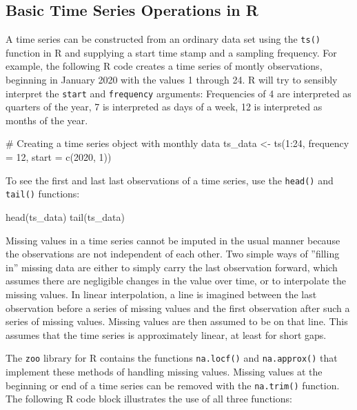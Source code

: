 \begin{withcode}
\section{Basic Time Series Operations in R}

A time series can be constructed from an ordinary data set using the \texttt{ts()} function in R and supplying a start time stamp and a sampling frequency. For example, the following R code creates a time series of montly observations, beginning in January 2020 with the values 1 through 24. R will try to sensibly interpret the \texttt{start} and \texttt{frequency} arguments: Frequencies of 4 are interpreted as quarters of the year, 7 is interpreted as days of a week, 12 is interpreted as months of the year.

\begin{Rcode}
# Creating a time series object with monthly data
ts_data <- ts(1:24, frequency = 12, start = c(2020, 1))
\end{Rcode}

\noindent To see the first and last last observations of a time series, use the \texttt{head()} and \texttt{tail()} functions:

\begin{Rcode}
head(ts_data)
tail(ts_data)
\end{Rcode}

Missing values in a time series cannot be imputed in the usual manner because the observations are not independent of each other. Two simple ways of ''filling in'' missing data are either to simply carry the last observation forward, which assumes there are negligible changes in the value over time, or to interpolate the missing values. In linear interpolation, a line is imagined between the last observation before a series of missing values and the first observation after such a series of missing values. Missing values are then assumed to be on that line. This assumes that the time series is approximately linear, at least for short gaps. 

The \texttt{zoo} library for R contains the functions \texttt{na.locf()} and \texttt{na.approx()} that implement these methods of handling missing values. Missing values at the beginning or end of a time series can be removed with the \texttt{na.trim()} function. The following R code block illustrates the use of all three functions:


\end{withcode}
